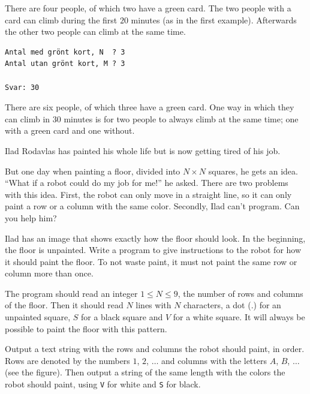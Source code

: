  There are four people, of which two have a green card.
The two people with a card can climb during the first $20$ minutes (as in the first example).
Afterwards the other two people can climb at the same time.

\vspace{0.5cm}

\begin{verbatim}
Antal med grönt kort, N  ? 3
Antal utan grönt kort, M ? 3

Svar: 30
\end{verbatim}

 There are six people, of which three have a green card.
One way in which they can climb in $30$ minutes is for two people to always climb at the same time; one with a green card and one without.


\newpage
{}

Ilad Rodavlas has painted his whole life but is now getting tired of his job.

But one day when painting a floor, divided into $N \times N$ squares, he gets an idea.
``What if a robot could do my job for me!'' he asked.
There are two problems with this idea.
First, the robot can only move in a straight line, so it can only paint a row or a column with the same color.
Secondly, Ilad can't program.
Can you help him?

Ilad has an image that shows exactly how the floor should look.
In the beginning, the floor is unpainted.
Write a program to give instructions to the robot for how it should paint the floor.
To not waste paint, it must not paint the same row or column more than once.


The program should read an integer $1 \leq N \leq 9$, the number of rows and columns of the floor.
Then it should read $N$ lines with $N$ characters, a dot ($.$) for an unpainted square, $S$ for a black square and $V$ for a white square.
It will always be possible to paint the floor with this pattern.

Output a text string with the rows and columns the robot should paint, in order.
Rows are denoted by the numbers $1$, $2$, $\dots$ and columns with the letters $A$, $B$, $\dots$ (see the figure).
Then output a string of the same length with the colors the robot should paint, using \texttt{V} for white and \texttt{S} for black.

